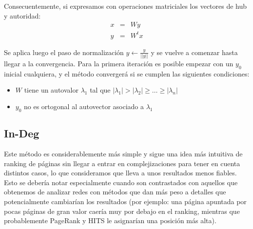 \documentclass[a4paper]{article}
\begin{document}
Consecuentemente, si expresamos con operaciones matriciales los vectores de hub y autoridad:
\begin{eqnarray*}
x &=& Wy \\
y &=& W^tx
\end{eqnarray*}

Se aplica luego el paso de normalizaci\'{o}n $y \leftarrow \frac{y}{||y||}$ y se vuelve a comenzar hasta llegar a la convergencia.
Para la primera iteraci\'{o}n es posible empezar con un $y_0$ inicial cualquiera, y el m\'{e}todo converger\'{a} si se cumplen las siguientes condiciones:

\begin{itemize}
\item $W$ tiene un autovalor $\lambda_1$ tal que $|\lambda_1| > |\lambda_2| \geq \dots \geq |\lambda_n|$ 
\item $y_0$ no es ortogonal al autovector asociado a $\lambda_1$
\end{itemize}






\subsection{In-Deg}

Este m\'etodo es considerablemente m\'{a}s simple y sigue una idea m\'{a}s intuitiva de ranking de p\'aginas sin llegar a entrar en complejizaciones para tener en cuenta distintos casos, lo que consideramos que lleva a unos resultados menos fiables. Esto se debería notar especialmente cuando son contrastados con aquellos que obtenemos de analizar redes con m\'etodos que dan m\'as peso a detalles que potencialmente cambiarían los resultados (por ejemplo: una página apuntada por pocas páginas de gran valor caería muy por debajo en el ranking, mientras que probablemente PageRank y HITS le asignarían una posición más alta).
\end{document}
